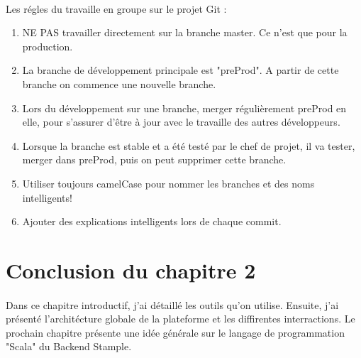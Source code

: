 \paragraph{}
Les régles du travaille en groupe sur le projet Git :
\begin{enumerate}
\item NE PAS travailler directement sur la branche master. Ce n'est que pour la production.
\item La branche de développement principale est "preProd". A partir de cette branche on commence une nouvelle branche. 
\item Lors du développement sur une branche, merger régulièrement preProd en elle, pour s'assurer d'être à jour avec le travaille des autres développeurs.
\item Lorsque la branche est stable et a été testé par le chef de projet, il va tester, merger dans preProd, puis on peut supprimer cette branche.
\item Utiliser toujours camelCase pour nommer les branches et des noms intelligents!
\item Ajouter des explications intelligents lors de chaque commit.
\end{enumerate}
\section{Conclusion du chapitre 2}
\paragraph{}
Dans ce chapitre introductif, j'ai détaillé les outils qu'on utilise. Ensuite, j'ai présenté l'architécture globale de la plateforme et les diffirentes interractions. Le prochain chapitre présente une idée générale sur le langage de programmation "Scala" du Backend Stample. 
